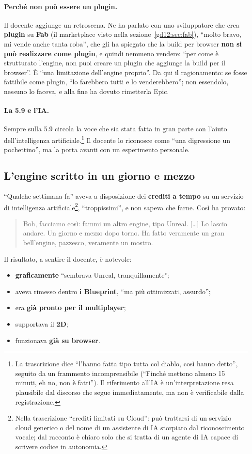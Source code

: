 \paragraph{Perché non può essere un plugin.} Il docente aggiunge un
retroscena. Ne ha parlato con uno sviluppatore che crea \textbf{plugin} su
\textbf{Fab} (il marketplace visto nella sezione~\ref{gd12:sec:fab}), ``molto
bravo, mi vende anche tanta roba'', che gli ha spiegato che la build per
browser \textbf{non si può realizzare come plugin}, e quindi nemmeno vendere:
``per come è strutturato l'engine, non puoi creare un plugin che aggiunge la
build per il browser''. È ``una limitazione dell'engine proprio''. Da qui il
ragionamento: se fosse fattibile come plugin, ``lo farebbero tutti e lo
venderebbero''; non essendolo, nessuno lo faceva, e alla fine ha dovuto
rimetterla Epic.

\paragraph{La 5.9 e l'IA.} Sempre sulla 5.9 circola la voce che sia stata
fatta in gran parte con l'aiuto dell'intelligenza
artificiale.\footnote{La trascrizione dice ``l'hanno fatta tipo tutta col
diablo, così hanno detto'', seguito da un frammento incomprensibile
(``Finché mettono almeno 15 minuti, eh no, non è fatti''). Il riferimento
all'IA è un'interpretazione resa plausibile dal discorso che segue
immediatamente, ma non è verificabile dalla registrazione.} Il docente lo
riconosce come ``una digressione un pochettino'', ma la porta avanti con un
esperimento personale.

\subsection{L'engine scritto in un giorno e mezzo}

``Qualche settimana fa'' aveva a disposizione dei \textbf{crediti a tempo} su
un servizio di intelligenza artificiale\footnote{Nella trascrizione ``crediti
limitati su Cloud'': può trattarsi di un servizio cloud generico o del nome di
un assistente di IA storpiato dal riconoscimento vocale; dal racconto è chiaro
solo che si tratta di un agente di IA capace di scrivere codice in autonomia.},
``troppissimi'', e non sapeva che farne. Così ha provato:
\begin{quote}
Boh, facciamo così: fammi un altro engine, tipo Unreal. [\dots] Lo lascio
andare. Un giorno e mezzo dopo torno. Ha fatto veramente un gran bell'engine,
pazzesco, veramente un mostro.
\end{quote}
Il risultato, a sentire il docente, è notevole:
\begin{itemize}
  \item \textbf{graficamente} ``sembrava Unreal, tranquillamente'';
  \item aveva rimesso dentro \textbf{i Blueprint}, ``ma più ottimizzati,
        assurdo'';
  \item era \textbf{già pronto per il multiplayer};
  \item supportava il \textbf{2D};
  \item funzionava \textbf{già su browser}.
\end{itemize}

